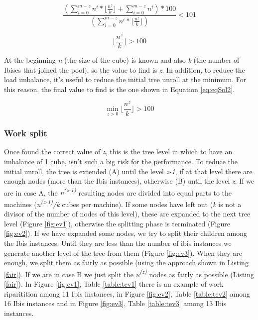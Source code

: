 \documentclass[a4paper]{article}
\begin{document}
\begin{equation} 
\label{eq:eqIne}
\frac{(\sum_{i=0}^{m-z}{n^i}*\lfloor\frac{n^z}{k}\rfloor +  \sum_{i=0}^{m-z}{n^i})*100}{(\sum_{i=0}^{m-z}{n^i}*\lfloor\frac{n^z}{k}\rfloor)} < 101
\end{equation}
\FloatBarrier

\begin{equation} 
\label{eq:eqSol}
\lfloor\frac{n^z}{k}\rfloor > 100
\end{equation}
\FloatBarrier

At the beginning \textit{n} (the size of the cube) is known and also \textit{k} (the number of Ibises that joined the pool), so the value to find is \textit{z}. In addition, to reduce the load imbalance, it's useful to reduce the initial tree unroll at the minimum. For this reason, the final value to find is the one shown in Equation \ref{eq:eqSol2}.

\begin{equation} 
\label{eq:eqSol2}
\min_{z>0} \lfloor\frac{n^z}{k}\rfloor > 100
\end{equation}
\FloatBarrier

\subsubsection{Work split}
\label{sec:ws}

Once found the correct value of \textit{z}, this is the tree level in which to have an imbalance of 1 cube, isn't such a big risk for the performance. 
To reduce the initial unroll, the tree is extended (A) until the level \textit{z-1}, if at that level there are enough nodes (more than the Ibis instances), otherwise (B) until the level \textit{z}. If we are in case A, the \textit{n\textsuperscript{(z-1)}} resulting nodes are divided into equal parts to the machines (\textit{n\textsuperscript{(z-1)}/k} cubes per machine). If some nodes have left out (\textit{k} is not a divisor of the number of nodes of this level), these are expanded to the next tree level (Figure \ref{fig:ev1}), otherwise the splitting phase is terminated (Figure \ref{fig:ev2}). If we have expanded some nodes, we try to split their children among the Ibis instances. Until they are less than the number of ibis instances we generate another level of the tree from them (Figure \ref{fig:ev3}). When they are enough, we split them as fairly as possible (using the approach shown in Listing \ref{fair}). If we are in case B we just split the \textit{n\textsuperscript{(z)}} nodes as fairly as possible (Listing \ref{fair}). In Figure \ref{fig:ev1}, Table \ref{table:tev1} there is an example of work riparitition among 11 Ibis instances, in Figure \ref{fig:ev2}, Table \ref{table:tev2} among 16 Ibis instances and in Figure \ref{fig:ev3}, Table \ref{table:tev3} among 13 Ibis instances. 
\end{document}
